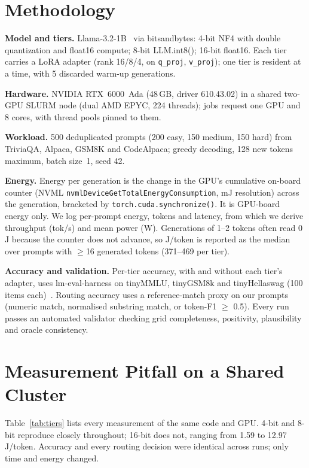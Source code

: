 \documentclass[conference]{IEEEtran}
\begin{document}
\section{Methodology}
\label{sec:method}
\textbf{Model and tiers.} Llama-3.2-1B~\cite{llama3} via bitsandbytes: 4-bit NF4 with double quantization and float16 compute; 8-bit LLM.int8(); 16-bit float16. Each tier carries a LoRA adapter (rank 16/8/4, on \texttt{q\_proj}, \texttt{v\_proj}); one tier is resident at a time, with 5 discarded warm-up generations.

\textbf{Hardware.} NVIDIA RTX~6000~Ada (48\,GB, driver 610.43.02) in a shared two-GPU SLURM node (dual AMD EPYC, 224 threads); jobs request one GPU and 8 cores, with thread pools pinned to them.

\textbf{Workload.} 500 deduplicated prompts (200 easy, 150 medium, 150 hard) from TriviaQA, Alpaca, GSM8K and CodeAlpaca; greedy decoding, 128 new tokens maximum, batch size~1, seed 42.

\textbf{Energy.} Energy per generation is the change in the GPU's cumulative on-board counter (NVML \texttt{nvmlDeviceGetTotalEnergyConsumption}, mJ resolution) across the generation, bracketed by \texttt{torch.cuda.synchronize()}. It is GPU-board energy only. We log per-prompt energy, tokens and latency, from which we derive throughput (tok/s) and mean power (W). Generations of 1--2 tokens often read 0\,J because the counter does not advance, so J/token is reported as the median over prompts with $\geq$16 generated tokens (371--469 per tier).

\textbf{Accuracy and validation.} Per-tier accuracy, with and without each tier's adapter, uses lm-eval-harness on tinyMMLU, tinyGSM8k and tinyHellaswag (100 items each)~\cite{polo2024tiny}. Routing accuracy uses a reference-match proxy on our prompts (numeric match, normalised substring match, or token-F1 $\geq$ 0.5). Every run passes an automated validator checking grid completeness, positivity, plausibility and oracle consistency.

\section{Measurement Pitfall on a Shared Cluster}
\label{sec:pitfall}
Table~\ref{tab:tiers} lists every measurement of the same code and GPU. 4-bit and 8-bit reproduce closely throughout; 16-bit does not, ranging from 1.59 to 12.97\,J/token. Accuracy and every routing decision were identical across runs; only time and energy changed.
\end{document}
